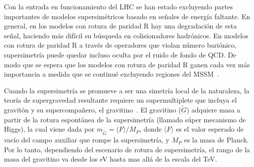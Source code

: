 Con la entrada en funcionamiento del LHC se han estado excluyendo
partes importantes de modelos supersimétricos basado en señales de
energía faltante. En general, en los modelos con rotura de paridad R hay
una degradación de esta señal, haciendo más difícil su búsqueda en
colisionadores hadrónicos. En modelos con rotura de paridad R a través
de operadores que violan número bariónico, supersimetría puede quedar
incluso oculta por el ruido de fondo de QCD. De modo que se espera que los
modelos con rotura de paridad R ganen cada vez más importancia a
medida que se continué excluyendo regiones del MSSM~\cite{Bomark:2011fj}.

Cuando la supersimetría se promueve a ser una simetría local de la
naturaleza, la teoría de supergravedad resultante requiere un
supermultiplete que incluya el gravitón y su supercompañero, el
gravitino~\cite{Martin:1997ns,Nilles:1983ge}. El gravitino ($\tilde
G$) adquiere masa a partir de la rotura espontánea de la
supersimetría (llamado súper mecanismo de Higgs), la cual viene dada
por $m_{\tilde G}=\langle F\rangle/M_P$, donde $\langle F\rangle$ es el valor esperado de vacío
del campo auxiliar que rompe la supersimetría, y $M_P$ es la masa de
Planck. Por lo tanto, dependiendo del escenario de rotura de
supersimetría, el rango de la masa del gravitino va desde los eV hasta
mas allá de la escala del TeV.

